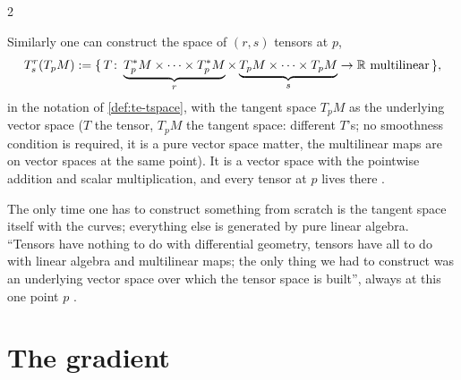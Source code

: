 \begin{paracol}{2}
\begin{definition}
Similarly one can construct the space of $(r,s)$ tensors at $p$,
\[
  T^r_s(T_pM):=\{\,T\colon\underbrace{T^*_pM\times\dots\times T^*_pM}_{r}\times\underbrace{T_pM\times\dots\times T_pM}_{s}\to\R\ \text{multilinear}\,\},
\]
in the notation of \cref{def:te-tspace}, with the tangent space $T_pM$ as the underlying vector space ($T$ the tensor, $T_pM$ the tangent space: different $T$'s; no smoothness condition is required, it is a pure vector space matter, the multilinear maps are on vector spaces at the same point). It is a vector space with the pointwise
addition and scalar multiplication, and every tensor at $p$ lives there      .
\end{definition}
The only time one has to construct something from scratch is the tangent space itself with the curves; everything else is generated by pure linear algebra. ``Tensors have nothing to do with differential geometry, tensors have all to do with linear algebra and multilinear maps; the only thing we had to construct was an underlying vector space over which the tensor space is
built'', always at this one point $p$   .

\section{The gradient}\label{sec:tb-gradient}


\end{paracol}
